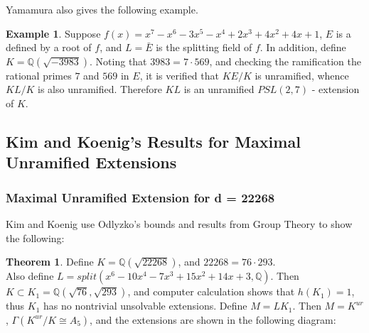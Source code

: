 \documentclass[12pt]{extarticle}
\newcommand{\Q}{\mathbb{Q}}
\newcommand{\<}{\langle}
\renewcommand{\>}{\rangle}
\theoremstyle{definition}
\newtheorem{theorem}{Theorem}
\newtheorem{example}{Example}
\begin{document}
Yamamura also gives the following example. 
\begin{example}
Suppose $f(x) = x^7 - x^6 - 3x^5 - x^4 + 2x^3 + 4x^2 + 4x + 1$, $E$ is a defined by a root of $f$, and $L = \bar{E}$ is the splitting field of $f$. In addition, define $K=\Q(\sqrt{-3983})$. Noting that $3983 = 7 \cdot 569$, and checking the ramification the rational primes $7$ and $569$ in $E$, it is verified that $KE/K$ is unramified, whence $KL/K$ is also unramified. Therefore $KL$ is an unramified $PSL(2,7)$ - extension of $K$. 
\end{example}

\subsection{Kim and Koenig's Results for Maximal Unramified Extensions}
\subsubsection*{Maximal Unramified Extension for d = 22268}
Kim and Koenig \cite{KIM2017} use Odlyzko's bounds and results from Group Theory to show the following: 
\begin{theorem}
 Define $K=\Q(\sqrt{22268})$, and $22268 = 76\cdot 293$. \\ Also define $L=split(x^6-10x^4-7x^3+15x^2+14x+3,\Q)$. Then $K \subset K_1=\Q(\sqrt{76},\sqrt{293})$, and computer calculation shows that $h(K_1) = 1$, thus $K_1$ has no nontrivial unsolvable extensions. Define $M=LK_1$. Then $M=K^{ur}$, $\Gamma(K^{ur}/K \cong A_5)$, and the extensions are shown in the following diagram:   
\end{theorem}
\begin{center}
\end{center}
\end{document}

